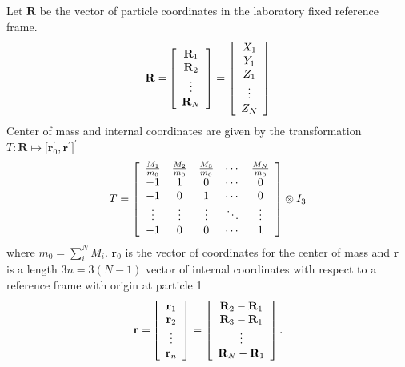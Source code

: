 \documentclass[12pt]{article}
\begin{document}
Let $\mathbf{R}$ be the vector of particle coordinates in the laboratory fixed
reference frame.
\begin{equation}
\mathbf{R=}\left[
\begin{array}
[c]{c}%
\mathbf{R}_{1}\\
\mathbf{R}_{2}\\
\vdots\\
\mathbf{R}_{N}%
\end{array}
\right]  =\left[
\begin{array}
[c]{c}%
X_{1}\\
Y_{1}\\
Z_{1}\\
\vdots\\
Z_{N}%
\end{array}
\right]
\end{equation}
Center of mass and internal coordinates are given by the transformation
$T:\mathbf{R}\mapsto\lbrack\mathbf{r}_{0}^{\prime},\mathbf{r}^{\prime
}]^{\prime}$
\begin{equation}
T=\left[
\begin{array}
[c]{ccccc}%
\frac{M_{1}}{m_{0}} & \frac{M_{2}}{m_{0}} & \frac{M_{3}}{m_{0}} & \cdots &
\frac{M_{N}}{m_{0}}\\
-1 & 1 & 0 & \cdots & 0\\
-1 & 0 & 1 & \cdots & 0\\
\vdots & \vdots & \vdots & \ddots & \vdots\\
-1 & 0 & 0 & \cdots & 1
\end{array}
\right]  \otimes I_{3}\label{Ttran}%
\end{equation}
where $m_{0}=\sum_{i}^{N}M_{i}$. $\mathbf{r}_{0}$ is the vector of coordinates
for the center of mass and $\mathbf{r}$ is a length $3n=3\left(  N-1\right)  $
vector of internal coordinates with respect to a reference frame with origin
at particle 1
\begin{equation}
\mathbf{r=}\left[
\begin{array}
[c]{c}%
\mathbf{r}_{1}\\
\mathbf{r}_{2}\\
\vdots\\
\mathbf{r}_{n}%
\end{array}
\right]  =\left[
\begin{array}
[c]{c}%
\mathbf{R}_{2}-\mathbf{R}_{1}\\
\mathbf{R}_{3}-\mathbf{R}_{1}\\
\vdots\\
\mathbf{R}_{N}-\mathbf{R}_{1}%
\end{array}
\right]  .\label{rdef}%
\end{equation}
\end{document}
